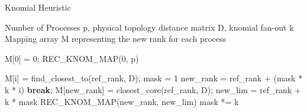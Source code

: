 \begin{algorithm}
  \caption{Knomial Heuristic}
  \label{alg:knomial}
  \begin{algorithmic}[1]
    \Require Number of Processes p, physical topology distance matrix D, knomial fan-out k
    \Ensure  Mapping array M representing the new rank for each process

    \State M[0] = 0;
    \State REC\_KNOM\_MAP(0, p)

    \State M[i] = find\_closest\_to(ref\_rank, D);
    \EndFor
    \State mask = 1
    \State new\_rank = ref\_rank + (mask * k * i)
    \State \textbf{break};
    \EndIf
    \State M[new\_rank] = closest\_core(ref\_rank, D);
    \State new\_lim = ref\_rank + k * mask
    \State REC\_KNOM\_MAP(new\_rank, new\_lim)
    \EndFor
    \State mask *= k
    \EndWhile
    \EndProcedure

  \end{algorithmic}
\end{algorithm}